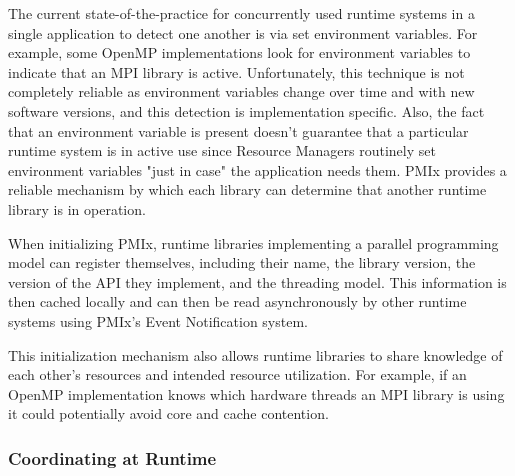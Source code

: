 The current state-of-the-practice for concurrently used runtime systems in a single application to detect one another is via set environment variables. For example, some OpenMP implementations look for environment variables to indicate that an MPI library is active.  Unfortunately, this technique is not completely reliable as environment variables change over time and with new software versions, and this detection is implementation specific. Also, the fact that an environment variable is present doesn't guarantee that a particular runtime system is in active use since Resource Managers routinely set environment variables "just in case" the application needs them. PMIx provides a reliable mechanism by which each library can determine that another runtime library is in operation.

When initializing PMIx, runtime libraries implementing a parallel programming model can register themselves, including their name, the library version, the version of the API they implement, and the threading model.  This information is then cached locally and can then be read asynchronously by other runtime systems using PMIx's Event Notification system.

This initialization mechanism also allows runtime libraries to share knowledge of each other's resources and intended resource utilization. For example, if an OpenMP implementation knows which hardware threads an MPI library is using it could potentially avoid core and cache contention.




{\large {}}



\subsubsection{Coordinating at Runtime}

